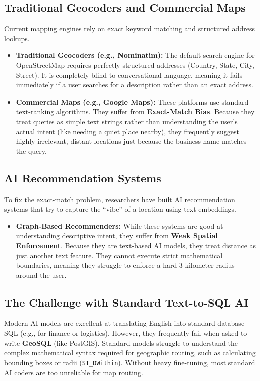 \documentclass[11pt,a4paper]{article}
\begin{document}
\subsection{Traditional Geocoders and Commercial Maps}
Current mapping engines rely on exact keyword matching and structured address lookups.
\begin{itemize}
    \item \textbf{Traditional Geocoders (e.g., Nominatim):} The default search engine for OpenStreetMap requires perfectly structured addresses (Country, State, City, Street). It is completely blind to conversational language, meaning it fails immediately if a user searches for a description rather than an exact address.
    \item \textbf{Commercial Maps (e.g., Google Maps):} These platforms use standard text-ranking algorithms. They suffer from \textbf{Exact-Match Bias}. Because they treat queries as simple text strings rather than understanding the user's actual intent (like needing a quiet place nearby), they frequently suggest highly irrelevant, distant locations just because the business name matches the query.
\end{itemize}

\subsection{AI Recommendation Systems}
To fix the exact-match problem, researchers have built AI recommendation systems that try to capture the ``vibe'' of a location using text embeddings.
\begin{itemize}
    \item \textbf{Graph-Based Recommenders:} While these systems are good at understanding descriptive intent, they suffer from \textbf{Weak Spatial Enforcement}. Because they are text-based AI models, they treat distance as just another text feature. They cannot execute strict mathematical boundaries, meaning they struggle to enforce a hard 3-kilometer radius around the user.
\end{itemize}

\subsection{The Challenge with Standard Text-to-SQL AI}
Modern AI models are excellent at translating English into standard database SQL (e.g., for finance or logistics). However, they frequently fail when asked to write \textbf{GeoSQL} (like PostGIS). Standard models struggle to understand the complex mathematical syntax required for geographic routing, such as calculating bounding boxes or radii (\texttt{ST\_DWithin}). Without heavy fine-tuning, most standard AI coders are too unreliable for map routing.
\end{document}
